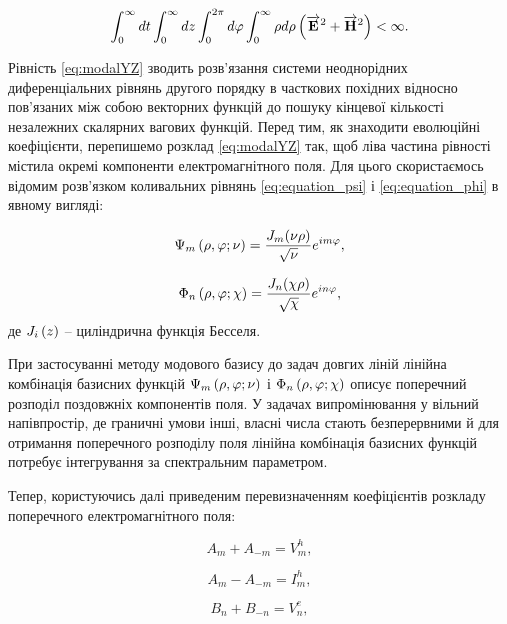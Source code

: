 \begin{equation} \label{eq:energy_restrict}
\int_0^\infty dt \int_0^\infty dz 
\int_0^{2\pi} d\varphi \int_0^\infty \rho d \rho
\left(  \overrightarrow{\mathbf E}^2 + \overrightarrow{\mathbf H}^2 \right) < \infty.
\end{equation}

Рівність \eqref{eq:modalYZ} зводить розв'язання системи неоднорідних 
диференціальних рівнянь другого порядку в часткових похідних  
відносно пов'язаних між собою векторних функцій до пошуку кінцевої кількості 
незалежних скалярних вагових функцій. Перед тим, як знаходити еволюційні 
коефіцієнти, перепишемо розклад \eqref{eq:modalYZ} так, щоб ліва 
частина рівності містила окремі компоненти електромагнітного поля. Для цього 
скористаємось відомим розв'язком коливальних рівнянь \eqref{eq:equation_psi} 
і \eqref{eq:equation_phi} в явному вигляді:

\begin{equation}
\Psi_m \left( \rho, \varphi; \nu \right) = 
\frac{J_m (\nu \rho)}{\sqrt{\nu}} e^{im\varphi},
\end{equation}

\begin{equation}
\Phi_n \left( \rho, \varphi; \chi \right) = 
\frac{J_n (\chi \rho)}{\sqrt{\chi}} e^{in\varphi},
\end{equation}
%
де $ J_i \left( z \right) $ -- циліндрична функція Бесселя. 

При застосуванні методу модового базису до задач довгих ліній  лінійна 
комбінація базисних функцiй $ \Psi_m \left( \rho, \varphi; \nu \right) $ і
$ \Phi_n \left( \rho, \varphi; \chi \right) $ описує поперечний розподіл 
поздовжніх компонентів поля. У задачах випромінювання у вільний 
напівпростір, де граничні умови інші, власні числа стають 
безперервними й для отримання поперечного розподілу поля лінійна 
комбінація базисних функцій потребує інтегрування за спектральним 
параметром.

Тепер, користуючись далі приведеним перевизначенням коефіцієнтів 
розкладу поперечного електромагнітного поля:

\begin{equation}
A_m + A_{-m} = V_m^h,
\end{equation}

\begin{equation}
A_m - A_{-m} = I_m^h,
\end{equation}

\begin{equation}
B_n + B_{-n} = V_n^e,
\end{equation}

